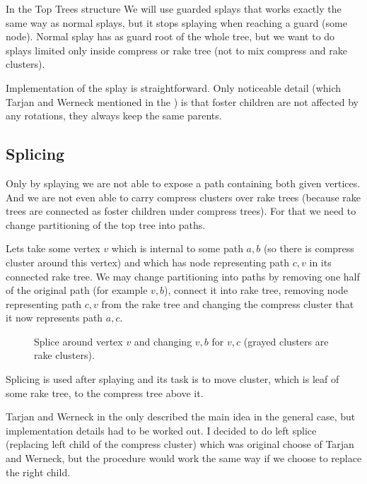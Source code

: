 In the Top Trees structure We will use {\I guarded splays} that works exactly
the same way as normal splays, but it stops splaying when reaching a guard (some
node). Normal splay has as guard root of the whole tree, but we want to do
splays limited only inside compress or rake tree (not to mix compress and
rake clusters).

Implementation of the splay is straightforward. Only noticeable detail (which
Tarjan and Werneck mentioned in the \cite{SelfAdjustingTT}) is that foster
children are not affected by any rotations, they always keep the same parents.

\subsection{Splicing}

Only by splaying we are not able to expose a path containing both given
vertices. And we are not even able to carry compress clusters over rake trees
(because rake trees are connected as foster children under compress trees). For
that we need to change partitioning of the top tree into paths.

Lets take some vertex $v$ which is internal to some path $a,b$ (so there is
compress cluster around this vertex) and which has node representing path $c,v$
in its connected rake tree. We may change partitioning into paths by removing
one half of the original path (for example $v,b$), connect it into rake tree,
removing node representing path $c,v$ from the rake tree and changing the
compress cluster that it now represents path $a,c$.

\begin{figure}[h]
\centering
{}
\caption{Splice around vertex $v$ and changing $v,b$ for $v,c$ (grayed clusters
are rake clusters).}
\end{figure}

Splicing is used after splaying and its task is to move cluster, which is leaf
of some rake tree, to the compress tree above it.

Tarjan and Werneck in the \cite{SelfAdjustingTT} only described the main idea in
the general case, but implementation details had to be worked out. I decided
to do {\I left splice} (replacing left child of the compress cluster) which was
original choose of Tarjan and Werneck, but the procedure would work the same
way if we choose to replace the right child.

